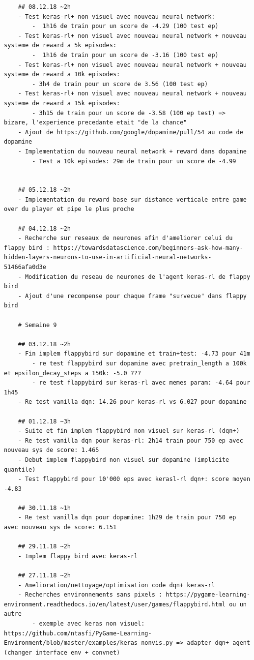 \documentclass[a4paper,10pt,openany,oneside]{report}
\begin{document}
\begin{lstlisting}
	## 08.12.18 ~2h
	- Test keras-rl+ non visuel avec nouveau neural network:
		-  1h16 de train pour un score de -4.29 (100 test ep)
	- Test keras-rl+ non visuel avec nouveau neural network + nouveau systeme de reward a 5k episodes:
		-  1h16 de train pour un score de -3.16 (100 test ep)
	- Test keras-rl+ non visuel avec nouveau neural network + nouveau systeme de reward a 10k episodes:
		- 3h4 de train pour un score de 3.56 (100 test ep)
	- Test keras-rl+ non visuel avec nouveau neural network + nouveau systeme de reward a 15k episodes:
		- 3h15 de train pour un score de -3.58 (100 ep test) => bizare, l'experience precedante etait "de la chance"
	- Ajout de https://github.com/google/dopamine/pull/54 au code de dopamine
	- Implementation du nouveau neural network + reward dans dopamine
		- Test a 10k episodes: 29m de train pour un score de -4.99
	
	
	## 05.12.18 ~2h
	- Implementation du reward base sur distance verticale entre game over du player et pipe le plus proche
	
	## 04.12.18 ~2h
	- Recherche sur reseaux de neurones afin d'ameliorer celui du flappy bird : https://towardsdatascience.com/beginners-ask-how-many-hidden-layers-neurons-to-use-in-artificial-neural-networks-51466afa0d3e
	- Modification du reseau de neurones de l'agent keras-rl de flappy bird
	- Ajout d'une recompense pour chaque frame "survecue" dans flappy bird
	
	# Semaine 9
	
	## 03.12.18 ~2h
	- Fin implem flappybird sur dopamine et train+test: -4.73 pour 41m
		- re test flappybird sur dopamine avec pretrain_length a 100k et epsilon_decay_steps a 150k: -5.0 ???
		- re test flappybird sur keras-rl avec memes param: -4.64 pour 1h45
	- Re test vanilla dqn: 14.26 pour keras-rl vs 6.027 pour dopamine
	
	## 01.12.18 ~3h
	- Suite et fin implem flappybird non visuel sur keras-rl (dqn+)
	- Re test vanilla dqn pour keras-rl: 2h14 train pour 750 ep avec nouveau sys de score: 1.465
	- Debut implem flappybird non visuel sur dopamine (implicite quantile)
	- Test flappybird pour 10'000 eps avec kerasl-rl dqn+: score moyen -4.83
	
	## 30.11.18 ~1h
	- Re test vanilla dqn pour dopamine: 1h29 de train pour 750 ep avec nouveau sys de score: 6.151
	
	## 29.11.18 ~2h
	- Implem flappy bird avec keras-rl
	
	## 27.11.18 ~2h
	- Amelioration/nettoyage/optimisation code dqn+ keras-rl
	- Recherches environnements sans pixels : https://pygame-learning-environment.readthedocs.io/en/latest/user/games/flappybird.html ou un autre
		- exemple avec keras non visuel: https://github.com/ntasfi/PyGame-Learning-Environment/blob/master/examples/keras_nonvis.py => adapter dqn+ agent (changer interface env + convnet)
	

\end{lstlisting}
\end{document}
